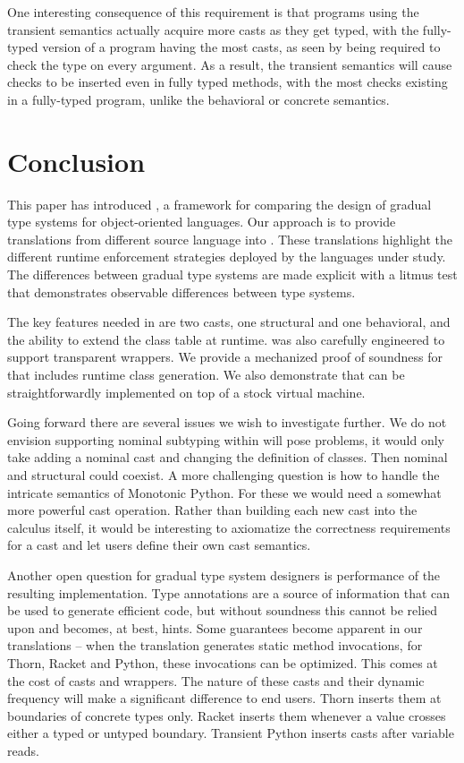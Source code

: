 \documentclass{tex/llncs}
\begin{document}
One interesting consequence of this requirement is that programs using the
transient semantics actually acquire more casts as they get typed, with the
fully-typed version of a program having the most casts, as seen by \m being
required to check the type on every argument. As a result, the transient
semantics will cause checks to be inserted even in fully typed methods, with
the most checks existing in a fully-typed program, unlike the behavioral or
concrete semantics.

\section{Conclusion}\label{litm}

This paper has introduced \kafka, a framework for comparing the design of
gradual type systems for object-oriented languages. Our approach is to
provide translations from different source language into \kafka. These
translations highlight the different runtime enforcement strategies deployed
by the languages under study. The differences between gradual type systems
are made explicit with a litmus test that demonstrates observable
differences between type systems.

The key features needed in \kafka are two casts, one structural and 
one behavioral, and the ability to extend the class table at runtime.
\kafka was also carefully engineered to support transparent wrappers.  We
provide a mechanized proof of soundness for \kafka that includes runtime
class generation.  We also demonstrate that \kafka can be straightforwardly
implemented on top of a stock virtual machine.

Going forward there are several issues we wish to investigate further.  We do
not envision supporting nominal subtyping within \kafka will pose
problems, it would only take adding a nominal cast and changing the
definition of classes. Then nominal and structural could coexist. A more
challenging question is how to handle the intricate semantics of Monotonic
Python. For these we would need a somewhat more powerful cast operation.
Rather than building each new cast into the calculus itself, it would be
interesting to axiomatize the correctness requirements for a cast and let
users define their own cast semantics. 

Another open question for gradual type system designers is performance of
the resulting implementation. Type annotations are a source of information
that can be used to generate efficient code, but without soundness this
cannot be relied upon and becomes, at best, hints.  Some guarantees become
apparent in our translations -- when the translation generates static method
invocations, for Thorn, Racket and Python, these invocations can be
optimized. This comes at the cost of casts and wrappers.  The nature of
these casts and their dynamic frequency will make a significant difference
to end users.  Thorn inserts them at boundaries of concrete types
only. Racket inserts them whenever a value crosses either a typed or untyped
boundary. Transient Python inserts casts after variable reads.
\end{document}
